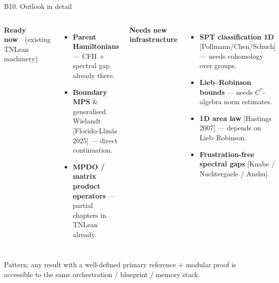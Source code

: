 \documentclass[aspectratio=169,10pt]{beamer}
\begin{document}
\begin{frame}{B10. Outlook in detail}
    \begin{columns}[T]
        \textcolor{leangreen}{\textbf{Ready now}\ \ (existing TNLean machinery)}
        \begin{itemize}
            \footnotesize
            \item \textbf{Parent Hamiltonians} --- CFII + spectral gap already there.
            \item \textbf{Boundary MPS} \& generalised Wielandt [Florido-Llin\'as 2025] --- direct continuation.
            \item \textbf{MPDO / matrix product operators} --- partial chapters in TNLean already.
        \end{itemize}
        \textcolor{amber}{\textbf{Needs new infrastructure}}
        \begin{itemize}
            \footnotesize
            \item \textbf{SPT classification 1D} [Pollmann/Chen/Schuch] --- needs cohomology over groups.
            \item \textbf{Lieb--Robinson bounds} --- needs $C^*$-algebra norm estimates.
            \item \textbf{1D area law} [Hastings 2007] --- depends on Lieb--Robinson.
            \item \textbf{Frustration-free spectral gaps} [Knabe / Nachtergaele / Anshu].
        \end{itemize}
    \end{columns}
    \vspace{0.6em}
    \textcolor{dimwhite}{\footnotesize Pattern: any result with a well-defined primary reference + modular proof is accessible to the same orchestration / blueprint / memory stack.}
\end{frame}
\end{document}
